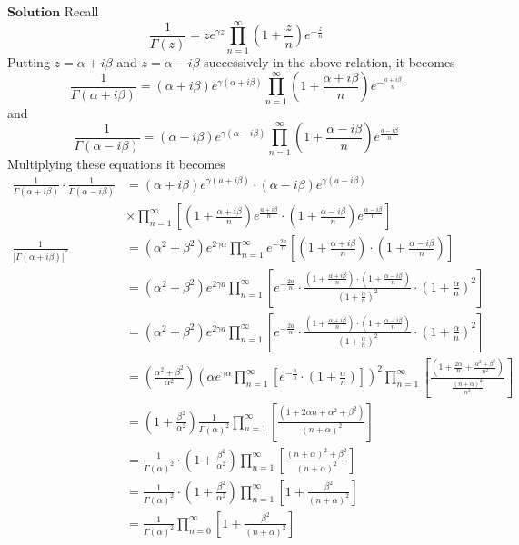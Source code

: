 $\boxed{\textbf{Solution}}$ Recall 
$$
\frac{1}{\Gamma(z)}=z e^{\gamma z} \prod_{n=1}^{\infty}\left(1+\frac{z}{n}\right) e^{-\frac{z}{n}}
$$
Putting $z=\alpha+i \beta$ and $z=\alpha-i \beta$ successively in the above relation, it becomes
$$
\frac{1}{\Gamma(\alpha+i \beta)}=(\alpha+i \beta) e^{\gamma(\alpha+i \beta)} \prod_{n=1}^{\infty}\left(1+\frac{\alpha+i \beta}{n}\right) e^{-\frac{a+i \beta}{n}}
$$
and 
$$
\frac{1}{\Gamma(\alpha-i \beta)}=(\alpha-i \beta) e^{\gamma(\alpha-i \beta)} \prod_{n=1}^{\infty}\left(1+\frac{\alpha-i \beta}{n}\right) e^{\frac{a-i \beta}{n}}
$$
Multiplying these equations it becomes
$$
\begin{aligned}
\frac{1}{\Gamma(\alpha+i \beta)} \cdot \frac{1}{\Gamma(\alpha-i \beta)}&=(\alpha+i \beta) e^{\gamma(a+i \beta)} \cdot(\alpha-i \beta) e^{\gamma(a-i \beta)} \\
&\times \prod_{n=1}^{\infty}\left[\left(1+\frac{\alpha+i \beta}{n}\right) e^{\frac{a+i \beta}{n}} \cdot\left(1+\frac{\alpha-i \beta}{n}\right) e^{\frac{\alpha-i \beta}{n}}\right] \\
\frac{1}{|\Gamma(\alpha+i \beta)|^{2}}&=\left(\alpha^{2}+\beta^{2}\right) e^{2\gamma \alpha} \prod_{n=1}^{\infty} e^{-\frac{2 a}{n}}\left[\left(1+\frac{\alpha+i \beta}{n}\right) \cdot\left(1+\frac{\alpha-i \beta}{n}\right)\right] \\
&=\left(\alpha^{2}+\beta^{2}\right) e^{2 \gamma a} \prod_{n=1}^{\infty}\left[e^{-\frac{2 a}{n}} \cdot \frac{\left(1+\frac{\alpha+i \beta}{n}\right) \cdot\left(1+\frac{\alpha-i \beta}{n}\right)}{\left(1+\frac{\alpha}{n}\right)^{2}} \cdot\left(1+\frac{\alpha}{n}\right)^{2}\right] \\
&=\left(\alpha^{2}+\beta^{2}\right) e^{2 \gamma a} \prod_{n=1}^{\infty}\left[e^{-\frac{2 a}{n}} \cdot \frac{\left(1+\frac{\alpha+i \beta}{n}\right) \cdot\left(1+\frac{\alpha-i \beta}{n}\right)}{\left(1+\frac{\alpha}{n}\right)^{2}} \cdot\left(1+\frac{\alpha}{n}\right)^{2}\right] \\
&=\left(\frac{\alpha^{2}+\beta^{2}}{\alpha^{2}}\right)\left(\alpha e^{\gamma \alpha} \prod_{n=1}^{\infty}\left[e^{-\frac{a}{n}} \cdot\left(1+\frac{\alpha}{n}\right)\right]\right)^{2} \prod_{n=1}^{\infty}\left[\frac{\left(1+\frac{2 \alpha}{n}+\frac{\alpha^{2}+\beta^{2}}{n^{2}}\right)}{\frac{(n+\alpha)^{2}}{n^{2}}}\right] \\
&=\left(1+\frac{\beta^{2}}{\alpha^{2}}\right) \frac{1}{\Gamma(\alpha)^{2}} \prod_{n=1}^{\infty}\left[\frac{\left(1+2 \alpha n+\alpha^{2}+\beta^{2}\right)}{(n+\alpha)^{2}}\right] \\
&=\frac{1}{\Gamma(\alpha)^{2}} \cdot\left(1+\frac{\beta^{2}}{\alpha^{2}}\right) \prod_{n=1}^{\infty}\left[\frac{(n+\alpha)^{2}+\beta^{2}}{(n+\alpha)^{2}}\right] \\
&=\frac{1}{\Gamma(\alpha)^{2}} \cdot\left(1+\frac{\beta^{2}}{\alpha^{2}}\right) \prod_{n=1}^{\infty}\left[1+\frac{\beta^{2}}{(n+\alpha)^{2}}\right] \\
&=\frac{1}{\Gamma(\alpha)^{2}} \prod_{n=0}^{\infty}\left[1+\frac{\beta^{2}}{(n+\alpha)^{2}}\right] \\
\end{aligned}
$$
